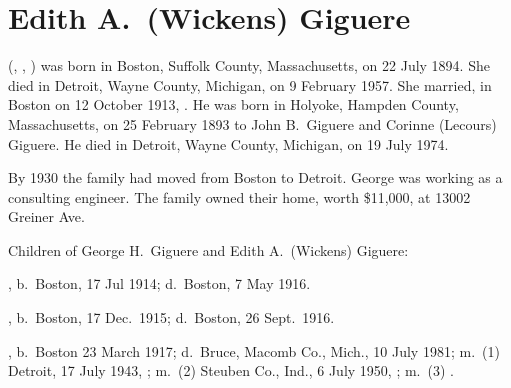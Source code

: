 \section{Edith A.\ (Wickens) Giguere}\label{per:Edith4Wickens}

 (, , ) was born in Boston, Suffolk County, Massachusetts, on 22 July 1894.\cite{Edith4WickensBirth} She died in Detroit, Wayne County, Michigan, on 9 February 1957.\cite{Edith4WickensDeath} She married, in Boston on 12 October 1913, .\cite{Edith4WickensMarriage} He was born in Holyoke, Hampden County, Massachusetts, on 25 February 1893 to John B.\ Giguere and Corinne (Lecours) Giguere.\cite{GeorgeGiguereBirth} He died in Detroit, Wayne County, Michigan, on 19 July 1974.\cite{GeorgeGiguereDeath}

By 1930 the family had moved from Boston to Detroit. George was working as a consulting engineer. The family owned their home, worth \$11,000, at 13002 Greiner Ave.\cite{Census1930GeorgeGiguere}

\begin{KidsIntro}
	Children of George H.\ Giguere and Edith A.\ (Wickens) Giguere:
\end{KidsIntro}

\begin{Kids}
	
	, b.\ Boston, 17 Jul 1914;\cite{ElmerGiguereBirth} d.\ Boston, 7 May 1916.\cite{ElmerGiguereDeath}
	
	, b.\ Boston, 17 Dec.\ 1915;\cite{Robert5GiguereDeath:1} d.\ Boston, 26 Sept.\ 1916.\cite{Robert5GiguereDeath:2}
	
	, b.\ Boston 23 March 1917;\cite{JohnMeyersMarriage:1} d.\ Bruce, Macomb Co., Mich., 10 July 1981;\cite{Dorris5GiguereMichiganDeath} m.\ (1) Detroit, 17 July 1943, ;\cite{RobertMayMarriage} m.\ (2) Steuben Co., Ind., 6 July 1950, ;\cite{JohnMeyersMarriage:2} m.\ (3) .\cite{Dorris5GiguereObit}
\end{Kids}